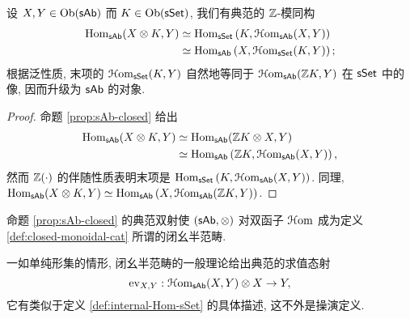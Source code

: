 \begin{corollary}
	设 $X, Y \in \operatorname{Ob}(\mathsf{sAb})$ 而 $K \in \operatorname{Ob}(\mathsf{sSet})$, 我们有典范的 $\mathbb{Z}$-模同构
	\begin{align*}
		\operatorname{Hom}_{\mathsf{sAb}}(X \otimes K, Y) & \simeq \operatorname{Hom}_{\mathsf{sSet}}\left( K, \EuScript{H}\mathrm{om}_{\mathsf{sAb}}(X, Y) \right) \\
		& \simeq \operatorname{Hom}_{\mathsf{sAb}}\left( X, \EuScript{H}\mathrm{om}_{\mathsf{sSet}}(K, Y) \right);
	\end{align*}
	根据泛性质, 末项的 $\EuScript{H}\mathrm{om}_{\mathsf{sSet}}(K, Y)$ 自然地等同于 $\EuScript{H}\mathrm{om}_{\mathsf{sAb}}(\mathbb{Z} K, Y)$ 在 $\mathsf{sSet}$ 中的像, 因而升级为 $\mathsf{sAb}$ 的对象.
\end{corollary}
\begin{proof}
	命题 \ref{prop:sAb-closed} 给出
	\begin{align*}
		\operatorname{Hom}_{\mathsf{sAb}}(X \otimes K, Y) & \simeq \operatorname{Hom}_{\mathsf{sAb}}(\mathbb{Z} K \otimes X, Y) \\
		& \simeq \operatorname{Hom}_{\mathsf{sAb}}\left( \mathbb{Z} K, \EuScript{H}\mathrm{om}_{\mathsf{sAb}}(X, Y) \right),
	\end{align*}
	然而 $\mathbb{Z}(\cdot)$ 的伴随性质表明末项是 $\operatorname{Hom}_{\mathsf{sSet}}\left( K, \EuScript{H}\mathrm{om}_{\mathsf{sAb}}(X, Y) \right)$. 同理, $\operatorname{Hom}_{\mathsf{sAb}}(X \otimes K, Y) \simeq \operatorname{Hom}_{\mathsf{sAb}}\left( X, \EuScript{H}\mathrm{om}_{\mathsf{sAb}}(\mathbb{Z} K, Y) \right)$.
\end{proof}

\begin{corollary}
	命题 \ref{prop:sAb-closed} 的典范双射使 $(\mathsf{sAb}, \otimes)$ 对双函子 $\EuScript{H}\mathrm{om}$ 成为定义 \ref{def:closed-monoidal-cat} 所谓的闭幺半范畴.
\end{corollary}

一如单纯形集的情形, 闭幺半范畴的一般理论给出典范的求值态射
\[ \mathrm{ev}_{X, Y}: \EuScript{H}\mathrm{om}_{\mathsf{sAb}}(X, Y) \otimes X \to Y, \]
它有类似于定义 \ref{def:internal-Hom-sSet} 的具体描述, 这不外是操演定义.

